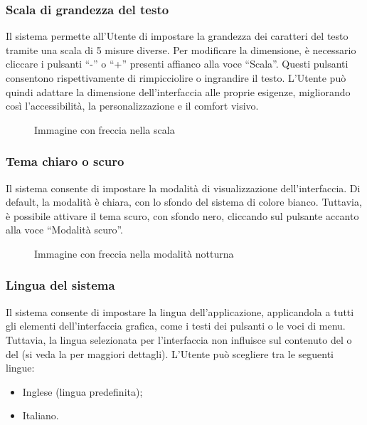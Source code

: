\subsubsection{Scala di grandezza del testo}

\par Il sistema permette all'Utente di impostare la grandezza dei caratteri del testo tramite una scala di 5 misure diverse. Per modificare la dimensione, è necessario cliccare i pulsanti ``-'' o ``+'' presenti affianco alla voce ``Scala''. Questi pulsanti consentono rispettivamente di rimpicciolire o ingrandire il testo. L'Utente può quindi adattare la dimensione dell'interfaccia alle proprie esigenze, migliorando così l'accessibilità, la personalizzazione e il comfort visivo.

\begin{figure}[H]
  \centering
  \caption{Immagine con freccia nella scala}
\end{figure}

\subsubsection{Tema chiaro o scuro} \label{sec:tema}

\par Il sistema consente di impostare la modalità di visualizzazione dell'interfaccia. Di default, la modalità è chiara, con lo sfondo del sistema di colore bianco. Tuttavia, è possibile attivare il tema scuro, con sfondo nero, cliccando sul pulsante accanto alla voce ``Modalità scuro''.

\begin{figure}[H]
  \centering
  \caption{Immagine con freccia nella modalità notturna}
\end{figure}

\subsubsection{Lingua del sistema} \label{sec:lingua}

\par Il sistema consente di impostare la lingua dell'applicazione, applicandola a tutti gli elementi dell'interfaccia grafica, come i testi dei pulsanti o le voci di menu. Tuttavia, la lingua selezionata per l'interfaccia non influisce sul contenuto del  o del  (si veda la  per maggiori dettagli). L'Utente può scegliere tra le seguenti lingue:
\begin{itemize}
  \item Inglese (lingua predefinita);
  \item Italiano.
\end{itemize}

